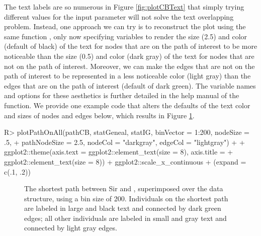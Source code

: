 \documentclass[article,shortnames]{jss}
\begin{document}
The text labels are so numerous in Figure \ref{fig:plotCBText} that simply trying different values for the input parameter  will not solve the text overlapping problem. Instead, one approach we can try is to reconstruct the plot using the same  function , only now specifying variables to render the size (2.5) and color (default of black) of the text for nodes that are on the path of interest to be more noticeable than the size (0.5) and color (dark gray) of the text for nodes that are not on the path of interest. Moreover, we can make the edges that are not on the path of interest to be represented in a less noticeable color (light gray) than the edges that are on the path of interest (default of dark green). The variable names and options for these aesthetics is further detailed in the help manual of the function. We provide one example code that alters the defaults of the text color and sizes of nodes and edges below, which results in Figure \ref{fig:plotCBNoText}.

\begin{CodeChunk}
\begin{CodeInput}
R> plotPathOnAll(pathCB, statGeneal, statIG, binVector = 1:200, nodeSize = .5,
+    pathNodeSize = 2.5, nodeCol = "darkgray", edgeCol = "lightgray") +
+    ggplot2::theme(axis.text = ggplot2::element_text(size = 8), axis.title =
+    ggplot2::element_text(size = 8)) + ggplot2::scale_x_continuous
+    (expand = c(.1, .2))
\end{CodeInput}
\end{CodeChunk}

\begin{figure}[H]
    \centering
    \caption{The shortest path between Sir  and , superimposed over the data structure, using a bin size of 200. Individuals on the shortest path are labeled in large and black text and connected by dark green edges; all other individuals are labeled in small and gray text and connected by light gray edges.}
    \label{fig:plotCBNoText}
\end{figure}
\end{document}
